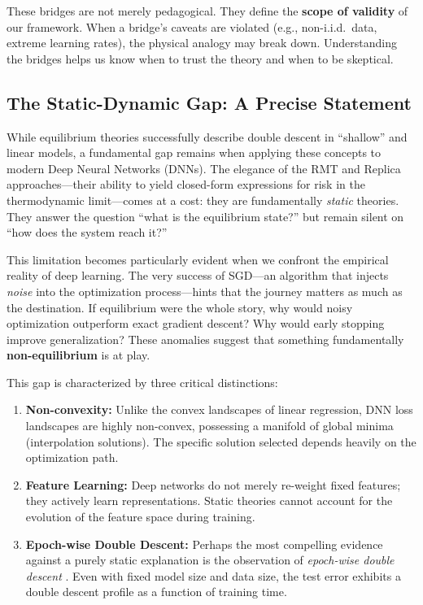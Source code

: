 \documentclass[
  journal=largetwo,
  simfonts=false,
  year=2025,
  volume=37,
]{cup-journal}
\begin{document}
\begin{remark}
These bridges are not merely pedagogical. They define the \textbf{scope of validity} of our framework. When a bridge's caveats are violated (e.g., non-i.i.d.\ data, extreme learning rates), the physical analogy may break down. Understanding the bridges helps us know when to trust the theory and when to be skeptical.
\end{remark}

\subsection{The Static-Dynamic Gap: A Precise Statement}

While equilibrium theories successfully describe double descent in ``shallow'' and linear models, a fundamental gap remains when applying these concepts to modern Deep Neural Networks (DNNs). The elegance of the RMT and Replica approaches---their ability to yield closed-form expressions for risk in the thermodynamic limit---comes at a cost: they are fundamentally \textit{static} theories. They answer the question ``what is the equilibrium state?'' but remain silent on ``how does the system reach it?''

This limitation becomes particularly evident when we confront the empirical reality of deep learning. The very success of SGD---an algorithm that injects \textit{noise} into the optimization process---hints that the journey matters as much as the destination. If equilibrium were the whole story, why would noisy optimization outperform exact gradient descent? Why would early stopping improve generalization? These anomalies suggest that something fundamentally \textbf{non-equilibrium} is at play.

This gap is characterized by three critical distinctions:

\begin{enumerate}
    \item \textbf{Non-convexity:} Unlike the convex landscapes of linear regression, DNN loss landscapes are highly non-convex, possessing a manifold of global minima (interpolation solutions). The specific solution selected depends heavily on the optimization path.
    \item \textbf{Feature Learning:} Deep networks do not merely re-weight fixed features; they actively learn representations. Static theories cannot account for the evolution of the feature space during training.
    \item \textbf{Epoch-wise Double Descent:} Perhaps the most compelling evidence against a purely static explanation is the observation of \textit{epoch-wise double descent} \cite{nakkiran2021optimalregularizationmitigatedouble, heckel2020early}. Even with fixed model size and data size, the test error exhibits a double descent profile as a function of training time.
\end{enumerate}
\end{document}
